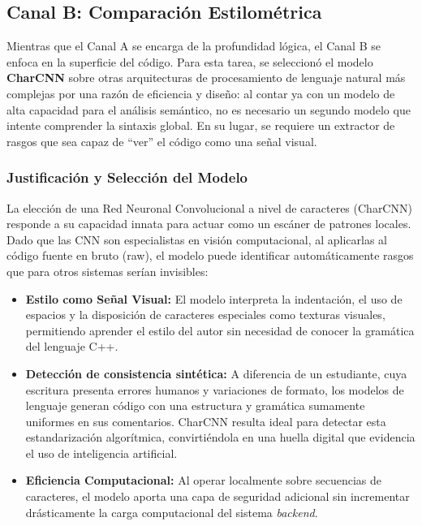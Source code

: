 \subsection{Canal B: Comparación Estilométrica}

Mientras que el Canal A se encarga de la profundidad lógica, el Canal B se enfoca en la superficie del código. Para esta tarea, se seleccionó el modelo \textbf{CharCNN} \cite{Zhang2015CharCNN} sobre otras arquitecturas de procesamiento de lenguaje natural más complejas por una razón de eficiencia y diseño: al contar ya con un modelo de alta capacidad para el análisis semántico, no es necesario un segundo modelo que intente comprender la sintaxis global. En su lugar, se requiere un extractor de rasgos que sea capaz de ``ver'' el código como una señal visual.

\subsubsection{Justificación y Selección del Modelo}

La elección de una Red Neuronal Convolucional a nivel de caracteres (CharCNN) responde a su capacidad innata para actuar como un escáner de patrones locales. Dado que las CNN son especialistas en visión computacional, al aplicarlas al código fuente en bruto (raw), el modelo puede identificar automáticamente rasgos que para otros sistemas serían invisibles:

\begin{itemize}
	\item \textbf{Estilo como Señal Visual:} El modelo interpreta la indentación, el uso de espacios y la disposición de caracteres especiales como texturas visuales, permitiendo aprender el estilo del autor sin necesidad de conocer la gramática del lenguaje C++.
    \item \textbf{Detección de consistencia sintética:} A diferencia de un estudiante, cuya escritura presenta errores humanos y variaciones de formato, los modelos de lenguaje generan código con una estructura y gramática sumamente uniformes en sus comentarios. CharCNN resulta ideal para detectar esta estandarización algorítmica, convirtiéndola en una huella digital que evidencia el uso de inteligencia artificial.
	\item \textbf{Eficiencia Computacional:} Al operar localmente sobre secuencias de caracteres, el modelo aporta una capa de seguridad adicional sin incrementar drásticamente la carga computacional del sistema \textit{backend}.
\end{itemize}



